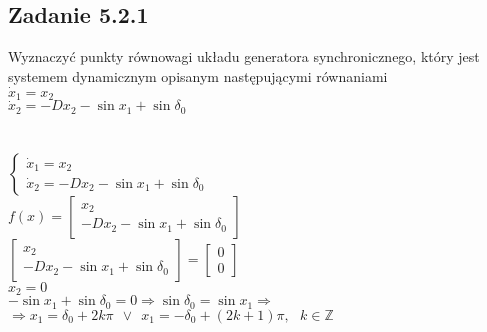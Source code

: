 
\pagebreak
\subsection*{Zadanie 5.2.1} {\color{darkgray}
	Wyznaczyć punkty równowagi układu generatora synchronicznego, który jest systemem dynamicznym opisanym następującymi równaniami\\
	$\dot{x}_1=x_2$\\
	$\dot{x}_2=-Dx_2-\sin x_1 + \sin \delta_0$\\
}\\\\
$\begin{cases}\dot{x}_1=x_2 \\ \dot{x}_2=-Dx_2-\sin x_1 + \sin \delta_0 \end{cases}$\\
$f(x)= \left[ \begin{array}{c}   x_2  \\  -Dx_2-\sin x_1 + \sin \delta_0  \end{array}\right]$\\
$\left[ \begin{array}{c}   x_2  \\  -Dx_2-\sin x_1 + \sin \delta_0  \end{array}\right] = \left[ \begin{array}{c}  0\\0  \end{array}\right]$\\
$x_2=0$\\
$-\sin x_1 + \sin \delta_0 = 0 \Rightarrow \sin\delta_0=\sin x_1 \Rightarrow$\\
$\Rightarrow x_1=\delta_0+2k\pi \ \ \vee\ \  x_1=-\delta_0+(2k+1)\pi, \ \ \ k \in \mathbb{Z}$\\




\pagebreak
